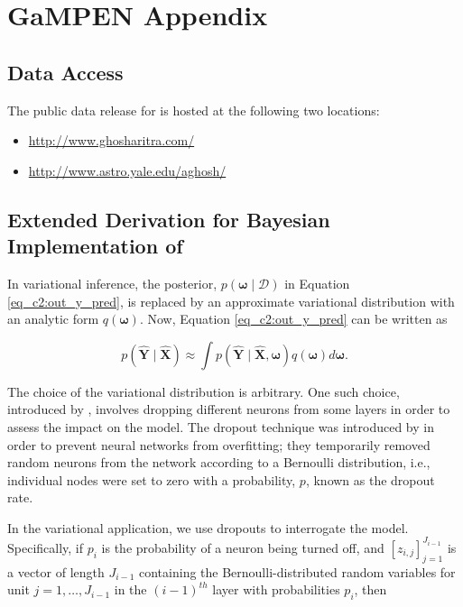 
\chapter*{GaMPEN Appendix}\label{ch:gampen_appendix}

\section{Data Access}\label{sec_c2:ap:data_access}
The public data release for \gampen{} is hosted at the following two locations:

\begin{itemize}
    \item \href{http://www.ghosharitra.com/}{http://www.ghosharitra.com/}
    \item \href{http://www.astro.yale.edu/aghosh/}{http://www.astro.yale.edu/aghosh/}
\end{itemize}


\section{Extended Derivation for Bayesian Implementation of \gampen{}} \label{sec_c2:ap:mcd_deri}

In variational inference, the posterior, $p(\boldsymbol{\omega} \mid \mathcal{D})$ in Equation \ref{eq_c2:out_y_pred}, is replaced by an approximate variational distribution with an analytic form $q(\boldsymbol{\omega})$. Now, Equation \ref{eq_c2:out_y_pred} can be written as

\begin{equation}
p(\boldsymbol{\hat{Y}} \mid \boldsymbol{\hat{X}}) \approx \int p(\boldsymbol{\hat{Y}} \mid \boldsymbol{\hat{X}}, \boldsymbol{\omega}) q(\boldsymbol{\omega}) d \boldsymbol{\omega} .
\label{eq_c2:out_y_pred_vi}
\end{equation}

The choice of the variational distribution is arbitrary. 
One such choice, introduced by \cite{gal_2016}, involves dropping different neurons from some layers in order to assess the impact on the model. 
The dropout technique was introduced by \cite{Srivastava2014Dropout:Overfitting} in order to prevent neural networks from overfitting; they temporarily removed random neurons from the network according to a Bernoulli distribution, i.e., individual nodes were set to zero with a probability, $p$, known as the dropout rate. 

In the variational application, we use dropouts to interrogate the model. 
Specifically, 
if $p_{i}$ is the probability of a neuron being turned off, and
$\left[z_{i, j}\right]_{j=1}^{J_{i-1}}$ is a vector of length $J_{i-1}$ containing the Bernoulli-distributed random variables for unit $j=1, \ldots, J_{i-1}$ in the $(i-1)^{th}$ layer with probabilities $p_i$, then

